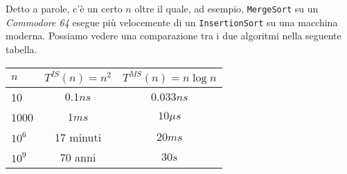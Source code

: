 Detto a parole, c'è un certo $n$ oltre il quale, ad esempio, \texttt{MergeSort} su un \emph{Commodore 64} 
esegue più velocemente di un \texttt{InsertionSort} su una macchina moderna. Possiamo vedere una comparazione tra i due algoritmi nella seguente tabella.
\begin{center}
	\begin{tabular}{l|c|c}
		$n$ & $T^{IS}(n)=n^2$ & $T^{MS}(n)=n \log n$ \\
		\hline
		10 & $0.1ns$ & $0.033ns$ \\
		\hline
		1000 & $1ms$ & $10\mu s$ \\
		\hline
		$10^6$ & 17 minuti & $20ms$ \\
		\hline
		$10^9$ & 70 anni & $30s$ \\
	\end{tabular}
\end{center}